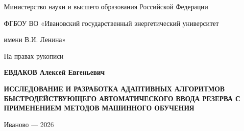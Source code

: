 
\begin{titlepage}
\centering
{\large Министерство науки и высшего образования Российской Федерации\par}
\vspace{1cm}
{\large ФГБОУ ВО «Ивановский государственный энергетический университет\par имени В.И. Ленина»\par}
\vspace{3cm}
{\large На правах рукописи\par}
\vspace{1.5cm}
{\Large\bfseries ЕВДАКОВ Алексей Евгеньевич\par}
\vspace{1.5cm}
{\LARGE\bfseries ИССЛЕДОВАНИЕ И РАЗРАБОТКА АДАПТИВНЫХ АЛГОРИТМОВ БЫСТРОДЕЙСТВУЮЩЕГО АВТОМАТИЧЕСКОГО ВВОДА РЕЗЕРВА С ПРИМЕНЕНИЕМ МЕТОДОВ МАШИННОГО ОБУЧЕНИЯ\par}
\vfill
{\large Иваново --- 2026\par}
\end{titlepage}
